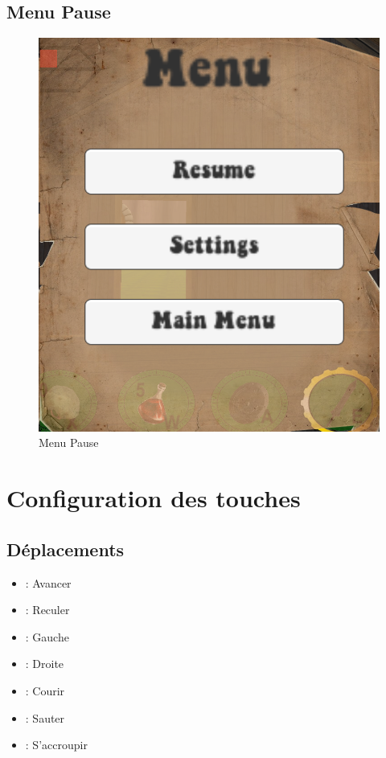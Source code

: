 \documentclass[a4paper]{article}
\begin{document}
	\subsection{Menu Pause}
	\begin{figure}[!ht]
		\centering
		\includegraphics[scale=0.25]{images/pause.png}
		\caption{Menu Pause}
	\end{figure}
	
	\section{Configuration des touches}
	\subsection{Déplacements}
	\begin{itemize}
		\item {} : Avancer
		\item {} : Reculer
		\item {} : Gauche
		\item {} : Droite
		\item {} : Courir
		\item {} : Sauter
		\item {} : S'accroupir
	\end{itemize}
	
\end{document}
